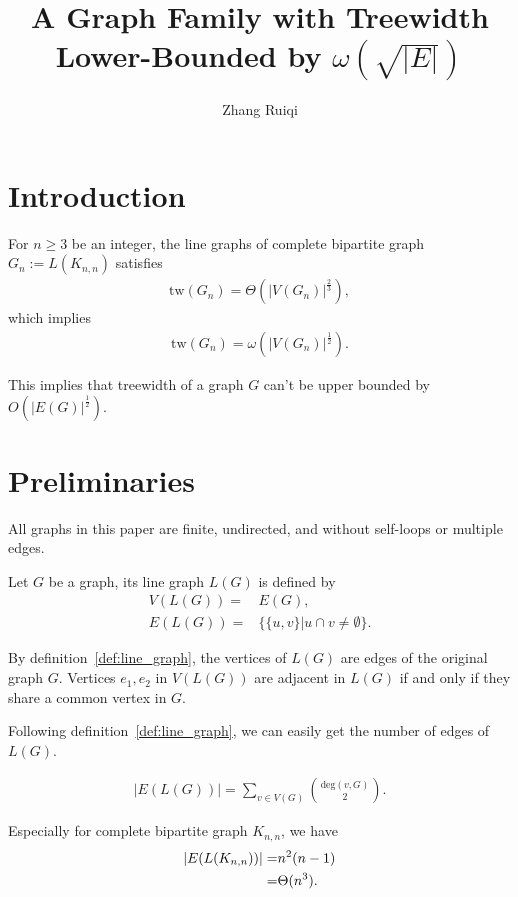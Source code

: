 \documentclass{article}
\newcommand{\degreevg}[2]{\text{deg}(#1,#2)}
\newcommand{\verticesg}[1]{V(#1)}
\newcommand{\edgesg}[1]{E(#1)}
\newcommand{\completebig}[2]{K_{#1,#2}}
\begin{document}
\title{A Graph Family with Treewidth Lower-Bounded by $\omega(\sqrt{|E|})$}
\author{Zhang Ruiqi}
\maketitle

\section{Introduction}
For $n \geq 3$ be an integer, the line graphs of complete bipartite graph $G_n :=L(K_{n,n})$ satisfies
\begin{align*}
    \mathrm{tw}(G_n) = \Theta(|V(G_n)|^{\frac{2}{3}}),
\end{align*}
which implies
\begin{align*}
    \mathrm{tw}(G_n) = \omega(|V(G_n)|^{\frac{1}{2}}).
\end{align*}

This implies that treewidth of a graph $G$ can't be upper bounded by $O(|\edgesg{G}|^{\frac{1}{2}})$.
\section{Preliminaries}
All graphs in this paper are finite, undirected, and without self-loops or multiple edges. 

\begin{definition}\label{def:line_graph}
Let $G$ be a graph, its line graph $L(G)$ is defined by
\begin{align*}
    \verticesg{L(G)} =& \edgesg{G},\\
    \edgesg{L(G)} =& \{\{u,v\}|u \cap v \neq \emptyset\}.
\end{align*}
\end{definition}

\begin{remark}
    By definition~\ref{def:line_graph}, the vertices of $L(G)$ are edges of the original graph $G$. Vertices $e_1, e_2$ in $\verticesg{L(G)}$ are adjacent in $L(G)$ if and only if they share a common vertex in $G$.
\end{remark}

\begin{remark}
    Following definition~\ref{def:line_graph}, we can easily get the number of edges of $L(G)$.

    \begin{align*}
        |\edgesg{L(G)}| = \sum_{v \in \verticesg{G}} \binom{\degreevg{v}{G}}{2}.
    \end{align*}
    
    Especially for complete bipartite graph $\completebig{n}{n}$, we have
    \begin{align}\label{eq:edges_linegraph_complete_bigraph}
        |\edgesg{L(\completebig{n}{n})}| =& n^2(n-1) \notag \\
        =& \Theta(n^3).
    \end{align}
\end{remark}
\end{document}
